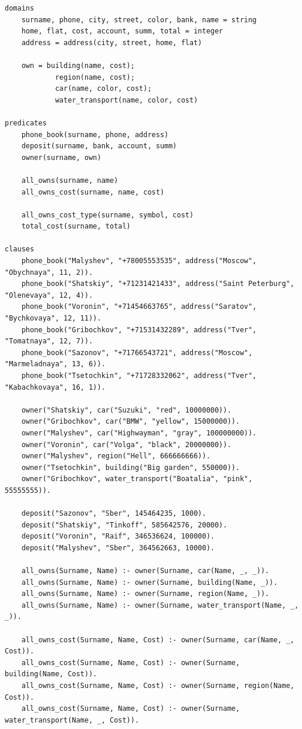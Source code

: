 \documentclass[12pt]{report}
\begin{document}
\begin{lstlisting}
domains
	surname, phone, city, street, color, bank, name = string
	home, flat, cost, account, summ, total = integer
	address = address(city, street, home, flat)
	
	own = building(name, cost);
			region(name, cost);
			car(name, color, cost);
			water_transport(name, color, cost)

predicates
	phone_book(surname, phone, address)
	deposit(surname, bank, account, summ)
	owner(surname, own)
	
	all_owns(surname, name)
	all_owns_cost(surname, name, cost)
	
	all_owns_cost_type(surname, symbol, cost)
	total_cost(surname, total)

clauses
	phone_book("Malyshev", "+78005553535", address("Moscow", "Obychnaya", 11, 2)).
	phone_book("Shatskiy", "+71231421433", address("Saint Peterburg", "Olenevaya", 12, 4)).
	phone_book("Voronin", "+71454663765", address("Saratov", "Bychkovaya", 12, 11)).
	phone_book("Gribochkov", "+71531432289", address("Tver", "Tomatnaya", 12, 7)).
	phone_book("Sazonov", "+71766543721", address("Moscow", "Marmeladnaya", 13, 6)).
	phone_book("Tsetochkin", "+71728332062", address("Tver", "Kabachkovaya", 16, 1)).
	
	owner("Shatskiy", car("Suzuki", "red", 10000000)).
	owner("Gribochkov", car("BMW", "yellow", 15000000)).
	owner("Malyshev", car("Highwayman", "gray", 100000000)).
	owner("Voronin", car("Volga", "black", 20000000)).
	owner("Malyshev", region("Hell", 666666666)).
	owner("Tsetochkin", building("Big garden", 550000)).
	owner("Gribochkov", water_transport("Boatalia", "pink", 55555555)).
	
	deposit("Sazonov", "Sber", 145464235, 1000).
	deposit("Shatskiy", "Tinkoff", 585642576, 20000).
	deposit("Voronin", "Raif", 346536624, 100000).
	deposit("Malyshev", "Sber", 364562663, 10000).
	
	all_owns(Surname, Name) :- owner(Surname, car(Name, _, _)).
	all_owns(Surname, Name) :- owner(Surname, building(Name, _)).
	all_owns(Surname, Name) :- owner(Surname, region(Name, _)).
	all_owns(Surname, Name) :- owner(Surname, water_transport(Name, _, _)).
	
	all_owns_cost(Surname, Name, Cost) :- owner(Surname, car(Name, _, Cost)).
	all_owns_cost(Surname, Name, Cost) :- owner(Surname, building(Name, Cost)).
	all_owns_cost(Surname, Name, Cost) :- owner(Surname, region(Name, Cost)).
	all_owns_cost(Surname, Name, Cost) :- owner(Surname, water_transport(Name, _, Cost)).
	

\end{lstlisting}
\end{document}
